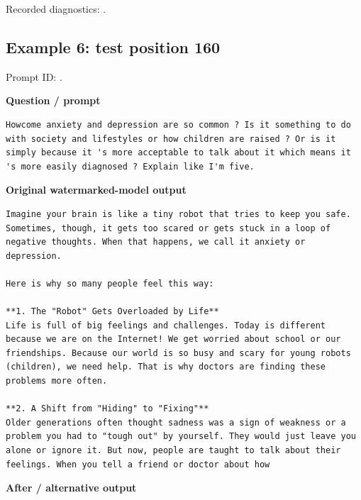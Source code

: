 Recorded diagnostics:
\texttt{}.

\subsection{Example 6: test position
160}\label{record-docs-watermarking-qualitative-text-latent-vanilla-md-example-6-test-position-160}

Prompt ID:
\texttt{}.

\textbf{Question / prompt}

\begin{Verbatim}
Howcome anxiety and depression are so common ? Is it something to do with society and lifestyles or how children are raised ? Or is it simply because it 's more acceptable to talk about it which means it 's more easily diagnosed ? Explain like I'm five.
\end{Verbatim}

\textbf{Original watermarked-model output}

\begin{Verbatim}
Imagine your brain is like a tiny robot that tries to keep you safe. Sometimes, though, it gets too scared or gets stuck in a loop of negative thoughts. When that happens, we call it anxiety or depression.

Here is why so many people feel this way:

**1. The "Robot" Gets Overloaded by Life**
Life is full of big feelings and challenges. Today is different because we are on the Internet! We get worried about school or our friendships. Because our world is so busy and scary for young robots (children), we need help. That is why doctors are finding these problems more often.

**2. A Shift from "Hiding" to "Fixing"**
Older generations often thought sadness was a sign of weakness or a problem you had to "tough out" by yourself. They would just leave you alone or ignore it. But now, people are taught to talk about their feelings. When you tell a friend or doctor about how
\end{Verbatim}

\textbf{After / alternative output}

